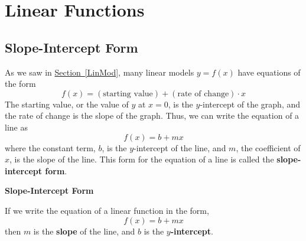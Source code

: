 \documentclass[10pt,]{book}
\newcommand{\terminology}[1]{\textbf{#1}}
\theoremstyle{plain}
\theoremstyle{definition}
\theoremstyle{definition}
\theoremstyle{definition}
\theoremstyle{definition}
\numberwithin{equation}{section}
\begin{document}
\section[Linear Functions]{Linear Functions}\label{linear-functions}
\typeout{************************************************}
\typeout{************************************************}
\subsection[Slope-Intercept Form]{Slope-Intercept Form}\label{subsection-24}

    As we saw in \hyperref[LinMod]{Section~\ref{LinMod}}, many linear models \(y = f (x)\) have equations of the form
    \begin{equation*}f (x) = (\text{starting value}) + (\text{rate of change}) \cdot x\end{equation*}
    The starting value, or the value of \(y\) at \(x = 0\), is the \(y\)-intercept of the graph, and the rate of change is the slope of the graph. Thus, we can write the equation of a line as
    \begin{equation*}f (x) = b + mx\end{equation*}
    where the constant term, \(b\), is the \(y\)-intercept of the line, and \(m\), the coefficient of \(x\), is the slope of the line. This form for the equation of a line is called the \terminology{slope-intercept form}.
%
\begin{mdframed}[style=assemblage]%
\noindent\textbf{\large Slope-Intercept Form}\label{assemblage-14}\par\medskip

        If we write the equation of a linear function in the form,
        \begin{equation*}f (x) = b + mx\end{equation*}
        then \(m\) is the \terminology{slope} of the line, and \(b\) is the \terminology{\(y\)-intercept}.
\end{mdframed}
\par
\end{document}
